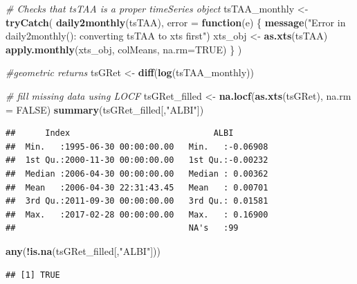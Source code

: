 \documentclass[
  12pt,
]{article}
\newenvironment{Shaded}{\begin{snugshade}}{\end{snugshade}}
\newcommand{\AttributeTok}[1]{\textcolor[rgb]{0.13,0.29,0.53}{#1}}
\newcommand{\CommentTok}[1]{\textcolor[rgb]{0.56,0.35,0.01}{\textit{#1}}}
\newcommand{\ConstantTok}[1]{\textcolor[rgb]{0.56,0.35,0.01}{#1}}
\newcommand{\ControlFlowTok}[1]{\textcolor[rgb]{0.13,0.29,0.53}{\textbf{#1}}}
\newcommand{\FunctionTok}[1]{\textcolor[rgb]{0.13,0.29,0.53}{\textbf{#1}}}
\newcommand{\NormalTok}[1]{#1}
\newcommand{\OtherTok}[1]{\textcolor[rgb]{0.56,0.35,0.01}{#1}}
\newcommand{\SpecialCharTok}[1]{\textcolor[rgb]{0.81,0.36,0.00}{\textbf{#1}}}
\newcommand{\StringTok}[1]{\textcolor[rgb]{0.31,0.60,0.02}{#1}}
\begin{document}
\begin{Shaded}
\begin{Highlighting}[]
\CommentTok{\# Checks that tsTAA is a proper \textquotesingle{}timeSeries\textquotesingle{} object}
\NormalTok{tsTAA\_monthly }\OtherTok{\textless{}{-}} \FunctionTok{tryCatch}\NormalTok{(}
  \FunctionTok{daily2monthly}\NormalTok{(tsTAA),}
  \AttributeTok{error =} \ControlFlowTok{function}\NormalTok{(e) \{}
    \FunctionTok{message}\NormalTok{(}\StringTok{"Error in daily2monthly(): converting tsTAA to xts first"}\NormalTok{)}
\NormalTok{    xts\_obj }\OtherTok{\textless{}{-}} \FunctionTok{as.xts}\NormalTok{(tsTAA)}
    \FunctionTok{apply.monthly}\NormalTok{(xts\_obj, colMeans, }\AttributeTok{na.rm=}\ConstantTok{TRUE}\NormalTok{)}
\NormalTok{  \}}
\NormalTok{)}



\CommentTok{\#geometric returns}
\NormalTok{tsGRet }\OtherTok{\textless{}{-}} \FunctionTok{diff}\NormalTok{(}\FunctionTok{log}\NormalTok{(tsTAA\_monthly))}

\CommentTok{\#  fill missing data using LOCF}
\NormalTok{tsGRet\_filled }\OtherTok{\textless{}{-}} \FunctionTok{na.locf}\NormalTok{(}\FunctionTok{as.xts}\NormalTok{(tsGRet), }\AttributeTok{na.rm =} \ConstantTok{FALSE}\NormalTok{)}
\FunctionTok{summary}\NormalTok{(tsGRet\_filled[,}\StringTok{"ALBI"}\NormalTok{])}
\end{Highlighting}
\end{Shaded}

\begin{verbatim}
##      Index                             ALBI         
##  Min.   :1995-06-30 00:00:00.00   Min.   :-0.06908  
##  1st Qu.:2000-11-30 00:00:00.00   1st Qu.:-0.00232  
##  Median :2006-04-30 00:00:00.00   Median : 0.00362  
##  Mean   :2006-04-30 22:31:43.45   Mean   : 0.00701  
##  3rd Qu.:2011-09-30 00:00:00.00   3rd Qu.: 0.01581  
##  Max.   :2017-02-28 00:00:00.00   Max.   : 0.16900  
##                                   NA's   :99
\end{verbatim}

\begin{Shaded}
\begin{Highlighting}[]
\FunctionTok{any}\NormalTok{(}\SpecialCharTok{!}\FunctionTok{is.na}\NormalTok{(tsGRet\_filled[,}\StringTok{"ALBI"}\NormalTok{]))}
\end{Highlighting}
\end{Shaded}

\begin{verbatim}
## [1] TRUE
\end{verbatim}
\end{document}
